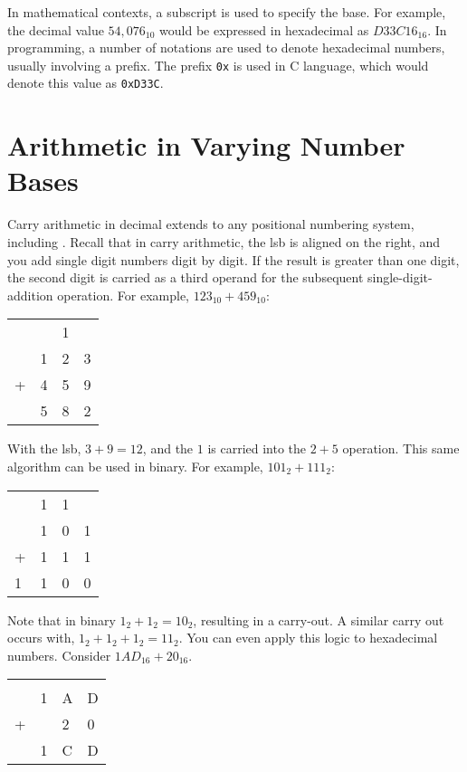 In mathematical contexts, a subscript is used to specify the base. For example, the decimal value $54,076_{10}$
would be expressed in hexadecimal as $D33C16_{16}$. In programming, a number of notations are used to denote
hexadecimal numbers, usually involving a prefix. The prefix \texttt{0x} is used in C language, which would 
denote this value as \texttt{0xD33C}. 

\section{Arithmetic in Varying Number Bases\label{sec:numbers:binarith}}

Carry arithmetic in decimal extends to any positional numbering system, including . Recall that 
in carry arithmetic, the \gls{lsb} is aligned on the right, and you add single digit numbers 
digit by digit. If the result is greater than one digit, the second digit is carried as a third 
operand for the subsequent single-digit-addition operation. For example, $123_{10} + 459_{10}$:

\vspace{1em}
\begin{tabular}{llll}
      &   & 1 &   \\
      & 1 & 2 & 3 \\
    + & 4 & 5 & 9 \\\hline
      & 5 & 8 & 2
\end{tabular}
\vspace{1em}

With the \gls{lsb}, $3+9=12$, and the $1$ is carried into the $2+5$ operation. This same algorithm 
can be used in binary. For example, $101_2 + 111_2$:

\vspace{1em}
\begin{tabular}{llll}
      & 1  & 1  &   \\
      & 1 & 0 & 1 \\
    + & 1 & 1 & 1 \\\hline
     1 & 1 & 0 & 0
\end{tabular}
\vspace{1em}

Note that in binary $1_2 + 1_2 = 10_2$, resulting in a carry-out. A similar carry out occurs with, 
$1_2 + 1_2 + 1_2 = 11_2$. You can even apply this logic to hexadecimal numbers. Consider 
$1AD_{16} + 20_{16}$. 

\vspace{1em}
\begin{tabular}{llll}
      &   &   &   \\
      & 1 & A & D \\
    + &   & 2 & 0 \\\hline
      & 1 & C & D
\end{tabular}
\vspace{1em}

